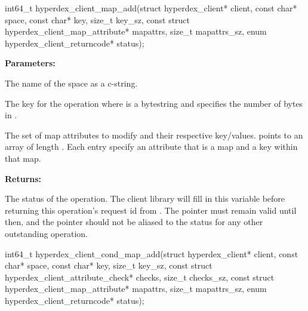 \funcsep
{}
\begin{ccode}
int64_t hyperdex_client_map_add(struct hyperdex_client* client,
                const char* space,
                const char* key, size_t key_sz,
                const struct hyperdex_client_map_attribute* mapattrs, size_t mapattrs_sz,
                enum hyperdex_client_returncode* status);
\end{ccode}
\funcdesc 

\noindent\textbf{Parameters:}
\begin{description}[labelindent=\widthof{{\code{mapattrs}, \code{mapattrs\_sz}}},leftmargin=*,noitemsep,nolistsep,align=right]
\item[\code{space}] The name of the space as a c-string.
\item[\code{key}, \code{key\_sz}] The key for the operation where  is a bytestring and  specifies the number of bytes in .
\item[\code{mapattrs}, \code{mapattrs\_sz}] The set of map attributes to modify and their respective key/values.   points to an array of length .  Each entry specify an attribute that is a map and a key within that map.
\end{description}

\noindent\textbf{Returns:}
\begin{description}[labelindent=\widthof{{\code{status}}},leftmargin=*,noitemsep,nolistsep,align=right]
\item[\code{status}] The status of the operation.  The client library will fill in this variable before returning this operation's request id from .  The pointer must remain valid until then, and the pointer should not be aliased to the status for any other outstanding operation.
\end{description}

\funcsep
{}
\begin{ccode}
int64_t hyperdex_client_cond_map_add(struct hyperdex_client* client,
                const char* space,
                const char* key, size_t key_sz,
                const struct hyperdex_client_attribute_check* checks, size_t checks_sz,
                const struct hyperdex_client_map_attribute* mapattrs, size_t mapattrs_sz,
                enum hyperdex_client_returncode* status);
\end{ccode}
\funcdesc 

